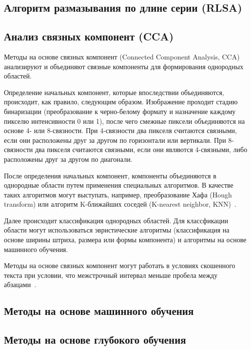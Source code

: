 \subsection{Алгоритм размазывания по длине серии (RLSA)}

\subsection{Анализ связных компонент (CCA)}

Методы на основе связных компонент (Connected Component Analysis, CCA) анализируют и объединяют связные компоненты для формирования однородных областей.

Определение начальных компонент, которые впоследствии объединяются, происходит, как правило, следующим образом.
Изображение проходит стадию бинаризации (преобразование к черно-белому формату и назначение каждому пикселю интенсивности 0 или 1), после чего смежные пиксели объединяются на основе 4- или 8-связности.
При 4-связности два пикселя считаются связными, если они расположены друг за другом по горизонтали или вертикали.
При 8-связности два пикселя считаются связными, если они являются 4-связными, либо расположены друг за другом по диагонали.

После определения начальных компонент, компоненты объединяются в однородные области путем применения специальных алгоритмов.
В качестве таких алгоритмов могут выступать, например, преобразование Хафа (Hough transform) или алгоритм K-ближайших соседей (K-nearest neighbor, KNN)~\cite{dla-book}.

Далее происходит классификация однородных областей.
Для классфикации области могут использоваться эвристические алгоритмы (классификация на основе ширины штриха, размера или формы компонента) и алгоритмы на основе машинного обучения.

Методы на основе связных компонент могут работать в условиях скошенного текста при условии, что межстрочный интервал меньше пробела между абзацами~\cite{dla-book}.

\subsection{Методы на основе машинного обучения}

\subsection{Методы на основе глубокого обучения}

